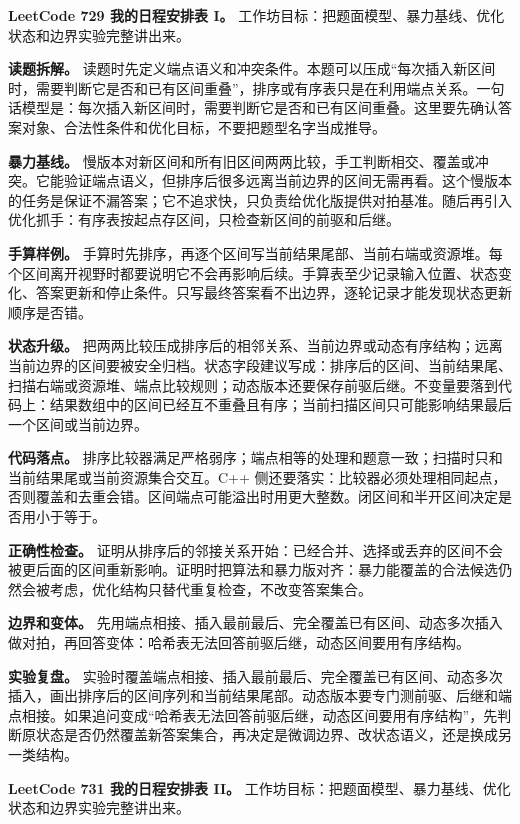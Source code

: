 \noindent\textbf{LeetCode 729 我的日程安排表 I。} 工作坊目标：把题面模型、暴力基线、优化状态和边界实验完整讲出来。

\textbf{读题拆解。} 读题时先定义端点语义和冲突条件。本题可以压成“每次插入新区间时，需要判断它是否和已有区间重叠”，排序或有序表只是在利用端点关系。一句话模型是：每次插入新区间时，需要判断它是否和已有区间重叠。这里要先确认答案对象、合法性条件和优化目标，不要把题型名字当成推导。

\textbf{暴力基线。} 慢版本对新区间和所有旧区间两两比较，手工判断相交、覆盖或冲突。它能验证端点语义，但排序后很多远离当前边界的区间无需再看。这个慢版本的任务是保证不漏答案；它不追求快，只负责给优化版提供对拍基准。随后再引入优化抓手：有序表按起点存区间，只检查新区间的前驱和后继。

\textbf{手算样例。} 手算时先排序，再逐个区间写当前结果尾部、当前右端或资源堆。每个区间离开视野时都要说明它不会再影响后续。手算表至少记录输入位置、状态变化、答案更新和停止条件。只写最终答案看不出边界，逐轮记录才能发现状态更新顺序是否错。

\textbf{状态升级。} 把两两比较压成排序后的相邻关系、当前边界或动态有序结构；远离当前边界的区间要被安全归档。状态字段建议写成：排序后的区间、当前结果尾、扫描右端或资源堆、端点比较规则；动态版本还要保存前驱后继。不变量要落到代码上：结果数组中的区间已经互不重叠且有序；当前扫描区间只可能影响结果最后一个区间或当前边界。

\textbf{代码落点。} 排序比较器满足严格弱序；端点相等的处理和题意一致；扫描时只和当前结果尾或当前资源集合交互。C++ 侧还要落实：比较器必须处理相同起点，否则覆盖和去重会错。区间端点可能溢出时用更大整数。闭区间和半开区间决定是否用小于等于。

\textbf{正确性检查。} 证明从排序后的邻接关系开始：已经合并、选择或丢弃的区间不会被更后面的区间重新影响。证明时把算法和暴力版对齐：暴力能覆盖的合法候选仍然会被考虑，优化结构只替代重复检查，不改变答案集合。

\textbf{边界和变体。} 先用端点相接、插入最前最后、完全覆盖已有区间、动态多次插入做对拍，再回答变体：哈希表无法回答前驱后继，动态区间要用有序结构。

\textbf{实验复盘。} 实验时覆盖端点相接、插入最前最后、完全覆盖已有区间、动态多次插入，画出排序后的区间序列和当前结果尾部。动态版本要专门测前驱、后继和端点相接。如果追问变成“哈希表无法回答前驱后继，动态区间要用有序结构”，先判断原状态是否仍然覆盖新答案集合，再决定是微调边界、改状态语义，还是换成另一类结构。

\noindent\textbf{LeetCode 731 我的日程安排表 II。} 工作坊目标：把题面模型、暴力基线、优化状态和边界实验完整讲出来。

